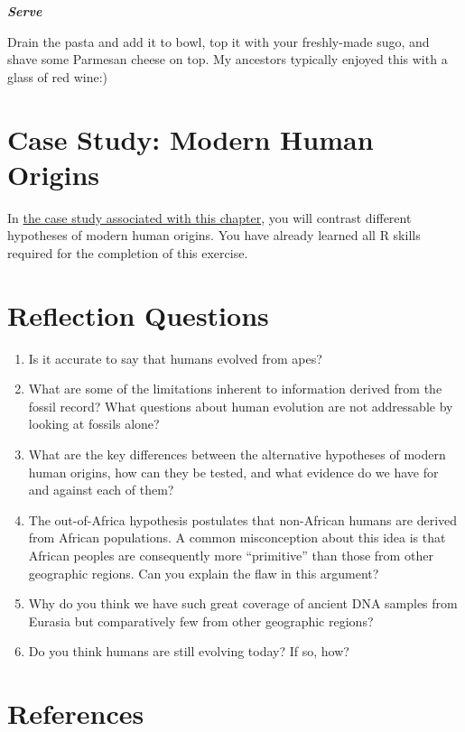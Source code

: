 \documentclass[
]{book}
\begin{document}
\textbf{\emph{Serve}}

Drain the pasta and add it to bowl, top it with your freshly-made sugo, and shave some Parmesan cheese on top. My ancestors typically enjoyed this with a glass of red wine:)

\hypertarget{case-study-modern-human-origins}{%
\section{Case Study: Modern Human Origins}\label{case-study-modern-human-origins}}

In \href{exercises/BIOL520-ex13.zip}{the case study associated with this chapter}, you will contrast different hypotheses of modern human origins. You have already learned all R skills required for the completion of this exercise.

\hypertarget{reflection-questions-13}{%
\section{Reflection Questions}\label{reflection-questions-13}}

\begin{enumerate}
\def\labelenumi{\arabic{enumi}.}
\item
  Is it accurate to say that humans evolved from apes?
\item
  What are some of the limitations inherent to information derived from the fossil record? What questions about human evolution are not addressable by looking at fossils alone?
\item
  What are the key differences between the alternative hypotheses of modern human origins, how can they be tested, and what evidence do we have for and against each of them?
\item
  The out-of-Africa hypothesis postulates that non-African humans are derived from African populations. A common misconception about this idea is that African peoples are consequently more ``primitive'' than those from other geographic regions. Can you explain the flaw in this argument?
\item
  Why do you think we have such great coverage of ancient DNA samples from Eurasia but comparatively few from other geographic regions?
\item
  Do you think humans are still evolving today? If so, how?
\end{enumerate}

\hypertarget{references-14}{%
\section{References}\label{references-14}}
\end{document}
